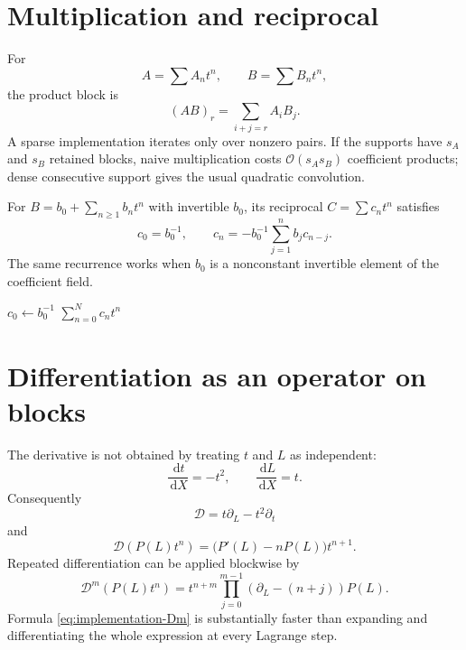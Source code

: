 \documentclass[11pt,oneside]{book}
\theoremstyle{definition}
\theoremstyle{remark}
\newcommand{\dd}{\,\mathrm d}
\newcommand{\D}{\mathcal D}
\newcommand{\bigO}{\mathcal O}
\begin{document}
\section{Multiplication and reciprocal}
For
\[
 A=\sum A_nt^n,\qquad B=\sum B_nt^n,
\]
the product block is
\[
 (AB)_r=\sum_{i+j=r}A_iB_j.
\]
A sparse implementation iterates only over nonzero pairs. If the supports
have $s_A$ and $s_B$ retained blocks, naive multiplication costs
$\bigO(s_As_B)$ coefficient products; dense consecutive support gives the
usual quadratic convolution.

For $B=b_0+\sum_{n\ge1}b_nt^n$ with invertible $b_0$, its reciprocal
$C=\sum c_nt^n$ satisfies
\begin{equation}\label{eq:implementation-reciprocal}
 c_0=b_0^{-1},\qquad
 c_n=-b_0^{-1}\sum_{j=1}^{n}b_jc_{n-j}.
\end{equation}
The same recurrence works when $b_0$ is a nonconstant invertible element of
the coefficient field.

\begin{algorithm}[H]
\caption{Truncated reciprocal}
$c_0\leftarrow b_0^{-1}$\;
\Return $\sum_{n=0}^{N}c_nt^n$\;
\end{algorithm}

\section{Differentiation as an operator on blocks}
The derivative is not obtained by treating $t$ and $L$ as independent:
\[
 \frac{\dd t}{\dd X}=-t^2,\qquad
 \frac{\dd L}{\dd X}=t.
\]
Consequently
\begin{equation}\label{eq:implementation-D}
 \D=t\partial_L-t^2\partial_t
\end{equation}
and
\begin{equation}\label{eq:implementation-D-block}
 \D\!\left(P(L)t^n\right)
 =\bigl(P'(L)-nP(L)\bigr)t^{n+1}.
\end{equation}
Repeated differentiation can be applied blockwise by
\begin{equation}\label{eq:implementation-Dm}
 \D^m\!\left(P(L)t^n\right)
 =t^{n+m}
 \prod_{j=0}^{m-1}
 \left(\partial_L-(n+j)\right)P(L).
\end{equation}
Formula \eqref{eq:implementation-Dm} is substantially faster than expanding
and differentiating the whole expression at every Lagrange step.
\end{document}
